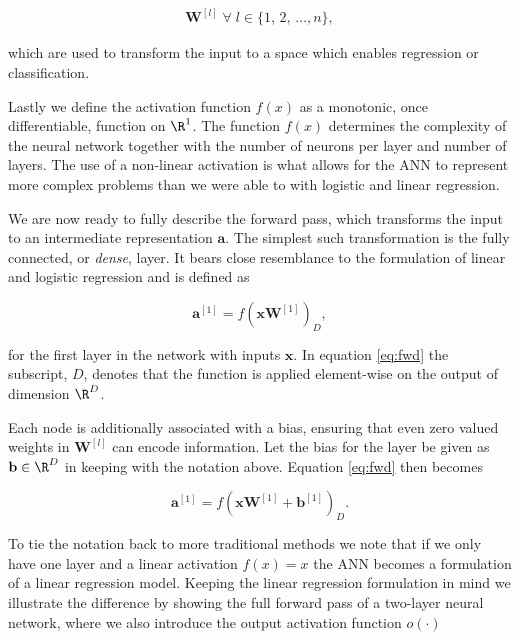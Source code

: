 \begin{align}
\mathbf{W}^{[l]} \; \forall \; l \in \{1,\, 2,\, \dots, n\},
\end{align}

\noindent which are used to transform the input to a space which enables regression or classification.  

Lastly we define the activation function $f(x)$ as a monotonic, once differentiable, function on $\R^1$. The function $f(x)$ determines the complexity of the neural network together with the number of neurons per layer and number of layers. The use of a non-linear activation is what allows for the ANN to represent more complex problems than we were able to with logistic and linear regression.

We are now ready to fully describe the forward pass, which transforms the input to an intermediate representation $\mathbf{a}$. The simplest such transformation is the fully connected, or \textit{dense}, layer. It bears close resemblance to the formulation of linear and logistic regression and is defined as 

\begin{equation}\label{eq:fwd}
	\mathbf{a}^{[1]} = f(\mathbf{x}\mathbf{W}^{[1]})_D,
\end{equation}

\noindent for the first layer in the network with inputs $\mathbf{x}$. In equation \ref{eq:fwd} the subscript, $D$, denotes that the function is applied element-wise on the output of dimension $\R^D$. 

Each node is additionally associated with a bias, ensuring that even zero valued weights in $\mathbf{W}^{[l]}$ can encode information. Let the bias for the layer be given as $\mathbf{b} \in \R^D$ in keeping with the notation above. Equation \ref{eq:fwd} then becomes

\begin{equation}\label{eq:fwd_b}
	\mathbf{a}^{[1]} = f(\mathbf{x}\mathbf{W}^{[1]} + \mathbf{b}^{[1]})_D.
\end{equation}

\noindent To tie the notation back to more traditional methods we note that if we only have one layer and a linear activation $f(x) = x$ the ANN becomes a formulation of a linear regression model. Keeping the linear regression formulation in mind we illustrate the difference by showing the full forward pass of a two-layer neural network, where we also introduce the output activation function $o(\cdot)$

